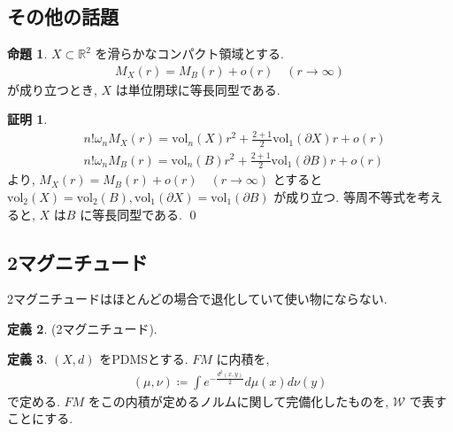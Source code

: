 \documentclass[10pt, fleqn, label-section=none]{bxjsarticle}
\theoremstyle{definition}
\newtheorem{dfn}{定義}[section]
\newtheorem{prop}[dfn]{命題}
\newtheorem*{pf*}{証明}
\newcommand{\vol}{\textrm{vol}}
\renewcommand{\;}{\, ; \,}
\begin{document}
\subsection{その他の話題}

\begin{prop}$X \subset \mathbb R^2$ を滑らかなコンパクト領域とする. 
\begin{align*} M_X (r) = M_B (r) + o(r) \quad (r \rightarrow \infty ) \end{align*}
が成り立つとき, $X$ は単位閉球に等長同型である. 

\end{prop}
\begin{pf*}
\begin{align*}&n! \omega_n M_X (r) = \vol_n (X) r^2 + \frac{2 + 1}{2} \vol_1 (\partial X) r + o(r) \\ 
&n! \omega_n M_B (r) = \vol_n (B) r^2 + \frac{2 + 1}{2} \vol_1 (\partial B) r + o(r) 
\end{align*}
より, $M_X (r) = M_B (r) + o(r) \quad (r \rightarrow \infty ) $ とすると$\vol_2 (X) = \vol_2 (B), \vol_1 (\partial X) = \vol_1 (\partial B)$ が成り立つ. 等周不等式を考えると, $X$ は$B$ に等長同型である. 
\qed
\end{pf*}







\subsection{2マグニチュード}

\begin{screen}
2マグニチュードはほとんどの場合で退化していて使い物にならない. 
\end{screen}

\begin{dfn}(2マグニチュード). 

\end{dfn}

\begin{dfn}$(X, d)$ をPDMSとする. $FM$ に内積を, 
\begin{align*} (\mu, \nu) \coloneqq \int e^{-\frac{d^2(x,y)}{2}} d\mu(x) d\nu(y)  \end{align*}
で定める. $FM$ をこの内積が定めるノルムに関して完備化したものを, $\mathcal W$ で表すことにする. 
\end{dfn}
\end{document}
